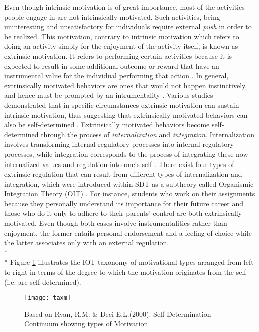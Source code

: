 Even though intrinsic motivation is of great importance, most of the activities people engage in are not intrinsically motivated. Such activities, being uninteresting and unsatisfactory for individuals  require external \textit{push} in order to be realized. This motivation, contrary to intrinsic motivation which refers to doing an activity simply for the enjoyment of the activity itself, is known as extrinsic motivation. It refers to performing certain activities because it is expected to result in some additional outcome or reward that have an instrumental value for the individual performing that action \cite{ryan2000self}. In general, extrinsically motivated behaviors are ones that would not happen instinctively, and hence must be prompted by an intrumentality \cite{deci1994promoting}. Various studies demonstrated that in specific circumstances extrinsic motivation can sustain intrinsic motivation, thus suggesting that extrinsically motivated behaviors can also be self-determined \cite{deci1994promoting}. Extrinsically motivated behaviors become self-determined through the process of \textit{internalization} and \textit{integration}. Internalization involves transforming internal regulatory processes into internal regulatory processes, while integration corresponds to the process of integrating these now internalized values and regulation into one's self \cite{deci1994promoting}. There exist four types of extrinsic regulation that can result from different types of internalization and integration, which were introduced within SDT as a subtheory called Organismic Integration Theory (OIT) \cite{ryan2000intrinsic, ryan2000self, deci1994promoting}. For instance, students who work on their assignments because they personally understand its importance for their future career and those who do it only to adhere to their parents' control are both extrinsically motivated. Even though both cases involve instrumentalities rather than enjoyment, the former entails personal endorsement and a feeling of choice while the latter associates only with an external regulation.\\*\\*
Figure \ref{fig:tax} illustrates the IOT taxonomy of motivational types arranged from left to right in terms of the degree to which the motivation originates from the self (i.e. are self-determined).
\begin{figure}[h]
    \centering
    \texttt{[image: taxm]}
    \caption{Based on Ryan, R.M. \& Deci E.L.(2000). Self-Determination Continuum showing types of Motivation}
    \label{fig:tax}
\end{figure}
